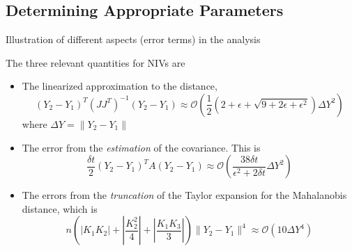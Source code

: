 \documentclass[1p]{elsarticle}
\begin{document}
\subsection{Determining Appropriate Parameters}

Illustration of different aspects (error terms) in the analysis

The three relevant quantities for NIVs are 
\begin{itemize}
\item The linearized approximation to the distance,
%
\begin{equation}
(Y_2 - Y_1)^T (JJ^T)^{-1} (Y_2 - Y_1) 
\approx \mathcal{O} \left(  \frac{1}{2} \left( 2 + \epsilon + \sqrt{ 9 + 2 \epsilon + \epsilon^2}\right) \Delta Y^2\right) 
\end{equation}
where $\Delta Y =  \|Y_2 - Y_1\|$

\item The error from the {\em estimation} of the covariance.
%
This is
\begin{equation}
\frac{\delta t}{2} (Y_2 - Y_1)^T A (Y_2 - Y_1) \approx \mathcal{O} \left( \frac{38 \delta t}{\epsilon ^2 + 2 \delta t}\Delta Y^2 \right)
\end{equation}

\item The errors from the {\em truncation} of the Taylor expansion for the Mahalanobis distance, which is 
\begin{equation}
n \left( \left| K_1 K_2 \right| + \left| \frac{ K_2^2}{4} \right|  + \left| \frac{K_1 K_3}{3} \right|  \right) \| Y_2 - Y_1 \| ^4 \approx \mathcal{O} \left( 10 \Delta Y^4  \right) 
\end{equation}

\end{itemize}
\end{document}
